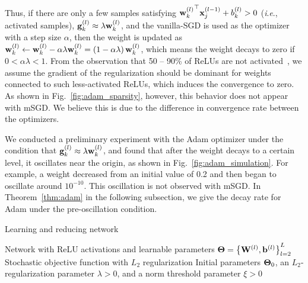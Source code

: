 \documentclass[conference]{IEEEtran}
\newcommand{\ie}{\textit{i}.\textit{e}.}
\newcommand{\relmiddle}[1]{\mathrel{}\middle#1\mathrel{}}
\begin{document}
Thus, if there are only a few samples satisfying ${{\bf w}_k^{\left( l \right)}}^\top {\bf x}_j^{\left( l-1 \right)} + b_k^{\left( l \right) } > 0$ (\ie, activated samples), 
${\bf g}_k^{\left( l \right) } \approx \lambda {\bf w}_k^{\left( l \right)}$, and
the vanilla-SGD is used as the optimizer with a step size $\alpha$, then the weight is updated as ${\bf w}_k^{\left( l \right)} \gets {\bf w}_k^{\left( l \right)} - \alpha \lambda {\bf w}_k^{\left( l \right)} = \left ( 1 - \alpha \lambda \right ) {\bf w}_k^{\left( l \right)}$, 
which means the weight decays to zero if $0 < \alpha \lambda < 1$.
From the observation that 50 -- 90\% of ReLUs are not activated~\cite{Glorot_2011}\cite{Shi_2017}, 
we assume the gradient of the regularization should be dominant for weights connected to such less-activated ReLUs, which induces the convergence to zero.
As shown in Fig.~\ref{fig:adam_sparsity}, however, this behavior does not appear with mSGD.
We believe this is due to the difference in convergence rate between the optimizers.

We conducted a preliminary experiment with the Adam optimizer under the condition that ${\bf g}_k^{\left( l \right) } \approx \lambda {\bf w}_k^{\left( l \right)}$, 
and found that after the weight decays to a certain level, it oscillates near the origin, as shown in Fig.~\ref{fig:adam_simulation}.
For example, a weight decreased from an initial value of 0.2 and then began to oscillate around $10^{-10}$. 
This oscillation is not observed with mSGD.
In Theorem~\ref{thm:adam} in the following subsection, we give the decay rate for Adam under the pre-oscillation condition.

\begin{algorithm}[tb]
	\caption{Learning and reducing network}
	\label{alg:learning}
	\begin{algorithmic}[1]
	\REQUIRE Network with ReLU activations and learnable parameters ${\bf \Theta} = \left \{ {\bf W}^{\left( l \right)}, {\bf b}^{\left( l \right)} \right \}_{l=2}^L$
	\REQUIRE Stochastic objective function with $L_2$ regularization
	\REQUIRE Initial parameters ${\bf \Theta}_0$, an $L_2$-regularization parameter $\lambda > 0$, and a norm threshold parameter $\xi > 0$
		\ENDWHILE
			\STATE{Eliminate $ \left \{ {\bf w}_k^{\left( l \right)} \relmiddle| \Vert {\bf w}_k^{\left( l \right)} \Vert_2 < \xi,\ k = 1, \dots, C^{\left( l \right)} \right \} $ \\ from ${\bf \Theta}_t$}
		\ENDFOR
	\end{algorithmic}
\end{algorithm}
\end{document}
